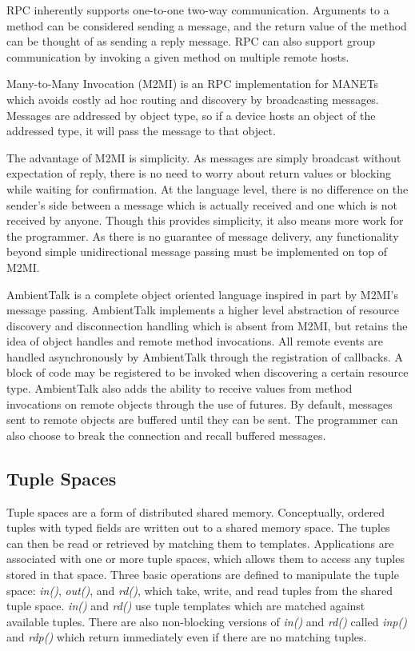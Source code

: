 RPC inherently supports one-to-one two-way communication. Arguments to a method can be considered sending a message, and the return value of the method can be thought of as sending a reply message. RPC can also support group communication by invoking a given method on multiple remote hosts.

Many-to-Many Invocation (M2MI)\cite{m2mi} is an RPC implementation for MANETs which avoids costly ad hoc routing and discovery by broadcasting messages. Messages are addressed by object type, so if a device hosts an object of the addressed type, it will pass the message to that object.

The advantage of M2MI is simplicity. As messages are simply broadcast without expectation of reply, there is no need to worry about return values or blocking while waiting for confirmation. At the language level, there is no difference on the sender's side between a message which is actually received and one which is not received by anyone. Though this provides simplicity, it also means more work for the programmer. As there is no guarantee of message delivery, any functionality beyond simple unidirectional message passing must be implemented on top of M2MI.

AmbientTalk\cite{ambienttalk} is a complete object oriented language inspired in part by M2MI's message passing. AmbientTalk implements a higher level abstraction of resource discovery and disconnection handling which is absent from M2MI, but retains the idea of object handles and remote method invocations. All remote events are handled asynchronously by AmbientTalk through the registration of callbacks. A block of code may be registered to be invoked when discovering a certain resource type. AmbientTalk also adds the ability to receive values from method invocations on remote objects through the use of futures. By default, messages sent to remote objects are buffered until they can be sent. The programmer can also choose to break the connection and recall buffered messages.

\subsection{Tuple Spaces}

Tuple spaces are a form of distributed shared memory. Conceptually, ordered tuples with typed fields are written out to a shared memory space. The tuples can then be read or retrieved by matching them to templates. Applications are associated with one or more tuple spaces, which allows them to access any tuples stored in that space. Three basic operations are defined to manipulate the tuple space: \textit{in()}, \textit{out()}, and \textit{rd()}, which take, write, and read tuples from the shared tuple space. \textit{in()} and \textit{rd()} use tuple templates which are matched against available tuples. There are also non-blocking versions of \textit{in()} and \textit{rd()} called \textit{inp()} and \textit{rdp()} which return immediately even if there are no matching tuples.

